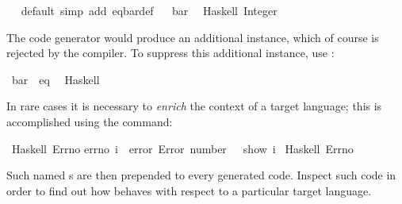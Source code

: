 \begin{isabellebody}
\isanewline
{}\isamarkupfalse%
\ \isamarkupfalse%
\ default\ {\isacharparenleft}simp\ add{\isacharcolon}\ eq{\isacharunderscore}bar{\isacharunderscore}def{\isacharparenright}\isanewline
\isanewline
{}\isamarkupfalse%
%
\endisatagquote
{\isafoldquote}%
%
\isadelimquote
%
\endisadelimquote
%
\isadelimquotett
\ %
\endisadelimquotett
%
\isatagquotett
{}\isamarkupfalse%
\ bar\isanewline
\ \ {\isacharparenleft}Haskell\ {\isachardoublequoteopen}Integer{\isachardoublequoteclose}{\isacharparenright}%
\endisatagquotett
{\isafoldquotett}%
%
\isadelimquotett
%
\endisadelimquotett
%
\begin{isamarkuptext}%
\noindent The code generator would produce
  an additional instance, which of course is rejected by the 
  compiler.
  To suppress this additional instance, use
  :%
\end{isamarkuptext}%
\isamarkuptrue%
%
\isadelimquotett
%
\endisadelimquotett
%
\isatagquotett
{}\isamarkupfalse%
\ bar\ {\isacharcolon}{\isacharcolon}\ eq\isanewline
\ \ {\isacharparenleft}Haskell\ {\isacharminus}{\isacharparenright}%
\endisatagquotett
{\isafoldquotett}%
%
\isadelimquotett
%
\endisadelimquotett
%
\isamarkuptrue%
%
\begin{isamarkuptext}%
In rare cases it is necessary to \emph{enrich} the context of a
  target language;  this is accomplished using the \hyperlink{command.code-include}{\mbox{}}
  command:%
\end{isamarkuptext}%
\isamarkuptrue%
%
\isadelimquotett
%
\endisadelimquotett
%
\isatagquotett
{}\isamarkupfalse%
\ Haskell\ {\isachardoublequoteopen}Errno{\isachardoublequoteclose}\isanewline
{\isacharverbatimopen}errno\ i\ {\isacharequal}\ error\ {\isacharparenleft}{\isachardoublequote}Error\ number{\isacharcolon}\ {\isachardoublequote}\ {\isacharplus}{\isacharplus}\ show\ i{\isacharparenright}{\isacharverbatimclose}\isanewline
\isanewline
{}\isamarkupfalse%
\ Haskell\ Errno%
\endisatagquotett
{\isafoldquotett}%
%
\isadelimquotett
%
\endisadelimquotett
%
\begin{isamarkuptext}%
\noindent Such named s are then prepended to every generated code.
  Inspect such code in order to find out how \hyperlink{command.code-include}{\mbox{}} behaves
  with respect to a particular target language.%
\end{isamarkuptext}%
\isamarkuptrue%
%
\isadelimtheory
%
\endisadelimtheory
%
\isatagtheory
{}\isamarkupfalse%
%
\endisatagtheory
{\isafoldtheory}%
%
\isadelimtheory
%
\endisadelimtheory
\isanewline
\end{isabellebody}%
